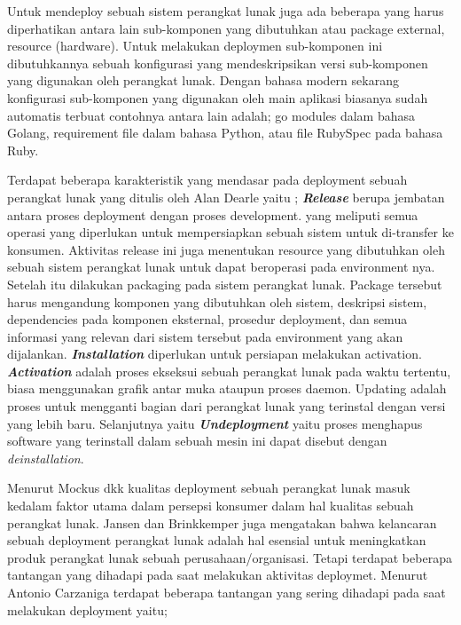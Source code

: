 Untuk mendeploy sebuah sistem perangkat lunak juga ada beberapa yang harus diperhatikan antara lain sub-komponen yang dibutuhkan atau package external,
resource (hardware). Untuk melakukan deploymen sub-komponen ini dibutuhkannya sebuah konfigurasi yang mendeskripsikan versi sub-komponen yang digunakan oleh perangkat lunak.
Dengan bahasa modern sekarang konfigurasi sub-komponen yang digunakan oleh main aplikasi biasanya sudah automatis terbuat contohnya antara lain adalah;
go modules  \cite{go_mod} dalam bahasa Golang, requirement file  \cite{requirementPython} dalam bahasa Python, atau file RubySpec  \cite{rubySpec} pada bahasa Ruby.
\par
Terdapat beberapa karakteristik yang mendasar pada deployment sebuah perangkat lunak yang ditulis oleh Alan Dearle yaitu  \cite{Dearle2007};
\textbf{\textit{Release}} berupa jembatan antara proses deployment dengan proses development. yang meliputi semua operasi
yang diperlukan untuk mempersiapkan sebuah sistem  untuk di-transfer ke konsumen.
Aktivitas release ini juga menentukan resource yang dibutuhkan oleh sebuah sistem perangkat lunak untuk dapat beroperasi pada environment nya.
Setelah itu dilakukan packaging pada sistem perangkat lunak.
Package tersebut harus mengandung komponen yang dibutuhkan oleh sistem, deskripsi sistem, dependencies pada komponen eksternal, prosedur deployment,
dan semua informasi yang relevan dari sistem tersebut pada environment yang akan dijalankan.
\textbf{\textit{Installation}} diperlukan untuk persiapan melakukan activation. \textbf{\textit{Activation}} adalah proses ekseksui sebuah perangkat lunak pada waktu tertentu, biasa menggunakan grafik antar muka ataupun proses daemon.
Updating adalah proses untuk mengganti bagian dari perangkat lunak yang terinstal dengan versi yang lebih baru.
Selanjutnya yaitu \textbf{\textit{Undeployment}} yaitu proses menghapus software yang terinstall dalam sebuah mesin ini dapat disebut dengan \textit{deinstallation}.
\par
Menurut Mockus dkk  \cite{Mockus2005} kualitas deployment sebuah perangkat lunak masuk kedalam faktor utama dalam persepsi konsumer dalam hal kualitas sebuah perangkat lunak.
Jansen dan Brinkkemper  \cite{Jansen2006} juga mengatakan bahwa kelancaran sebuah deployment perangkat lunak adalah hal esensial untuk meningkatkan produk perangkat lunak sebuah perusahaan/organisasi.
Tetapi terdapat beberapa tantangan yang dihadapi pada saat melakukan aktivitas deploymet.
Menurut Antonio Carzaniga  \cite{Carzaniga1998} terdapat beberapa tantangan yang sering dihadapi pada saat melakukan deployment yaitu;
